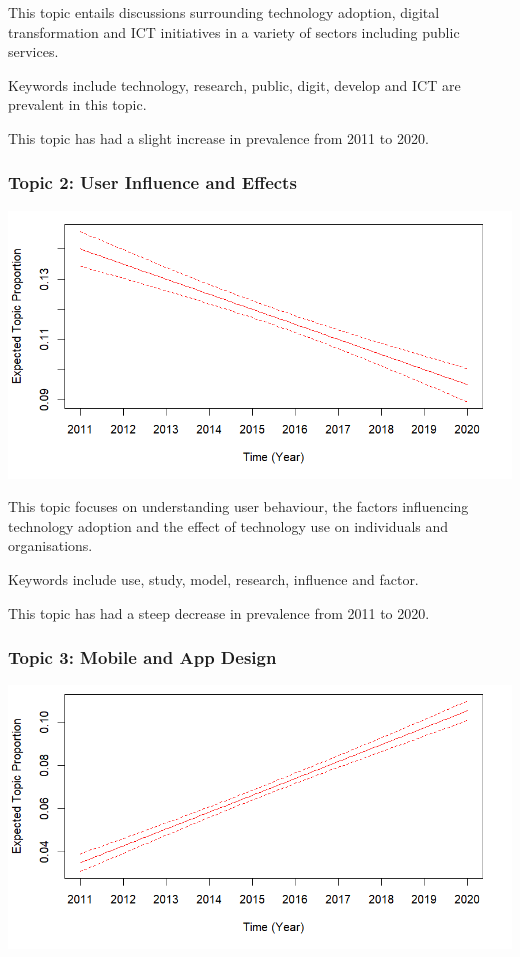 \documentclass[
  letterpaper,
  DIV=11,
  numbers=noendperiod]{scrartcl}
\begin{document}
This topic entails discussions surrounding technology adoption, digital
transformation and ICT initiatives in a variety of sectors including
public services.

Keywords include technology, research, public, digit, develop and ICT
are prevalent in this topic. ~

This topic has had a slight increase in prevalence from 2011 to 2020.

\hypertarget{topic-2-user-influence-and-effects}{%
\subsubsection{Topic 2: User Influence and
Effects}\label{topic-2-user-influence-and-effects}}

\includegraphics{images/topic2.png}

This topic focuses on understanding user behaviour, the factors
influencing technology adoption and the effect of technology use on
individuals and organisations.

Keywords include use, study, model, research, influence and factor.

This topic has had a steep decrease in prevalence from 2011 to 2020.

\hypertarget{topic-3-mobile-and-app-design}{%
\subsubsection{Topic 3: Mobile and App
Design}\label{topic-3-mobile-and-app-design}}

\includegraphics{images/topic3.png}
\end{document}

